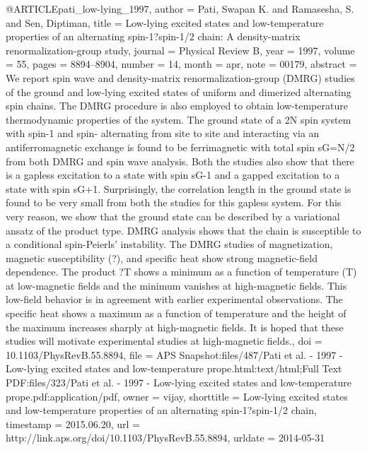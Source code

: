 @ARTICLE{pati_low-lying_1997,
  author = {Pati, Swapan K. and Ramasesha, S. and Sen, Diptiman},
  title = {Low-lying excited states and low-temperature properties of an alternating
	spin-1?spin-1/2 chain: {A} density-matrix renormalization-group study},
  journal = {Physical Review B},
  year = {1997},
  volume = {55},
  pages = {8894--8904},
  number = {14},
  month = apr,
  note = {00179},
  abstract = {We report spin wave and density-matrix renormalization-group (DMRG)
	studies of the ground and low-lying excited states of uniform and
	dimerized alternating spin chains. The DMRG procedure is also employed
	to obtain low-temperature thermodynamic properties of the system.
	The ground state of a 2N spin system with spin-1 and spin- alternating
	from site to site and interacting via an antiferromagnetic exchange
	is found to be ferrimagnetic with total spin sG=N/2 from both DMRG
	and spin wave analysis. Both the studies also show that there is
	a gapless excitation to a state with spin sG-1 and a gapped excitation
	to a state with spin sG+1. Surprisingly, the correlation length in
	the ground state is found to be very small from both the studies
	for this gapless system. For this very reason, we show that the ground
	state can be described by a variational ansatz of the product type.
	DMRG analysis shows that the chain is susceptible to a conditional
	spin-Peierls' instability. The DMRG studies of magnetization, magnetic
	susceptibility (?), and specific heat show strong magnetic-field
	dependence. The product ?T shows a minimum as a function of temperature
	(T) at low-magnetic fields and the minimum vanishes at high-magnetic
	fields. This low-field behavior is in agreement with earlier experimental
	observations. The specific heat shows a maximum as a function of
	temperature and the height of the maximum increases sharply at high-magnetic
	fields. It is hoped that these studies will motivate experimental
	studies at high-magnetic fields.},
  doi = {10.1103/PhysRevB.55.8894},
  file = {APS Snapshot:files/487/Pati et al. - 1997 - Low-lying excited states and low-temperature prope.html:text/html;Full Text PDF:files/323/Pati et al. - 1997 - Low-lying excited states and low-temperature prope.pdf:application/pdf},
  owner = {vijay},
  shorttitle = {Low-lying excited states and low-temperature properties of an alternating
	spin-1?spin-1/2 chain},
  timestamp = {2015.06.20},
  url = {http://link.aps.org/doi/10.1103/PhysRevB.55.8894},
  urldate = {2014-05-31}
}


